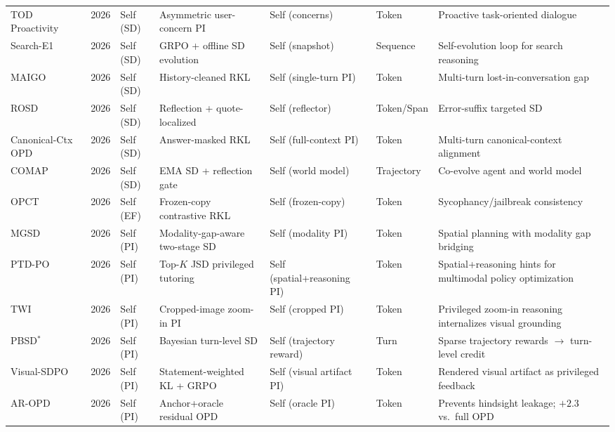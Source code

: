 \documentclass{article} %
\begin{document}
\begin{table}[t]
{\begin{tabular}{@{}lclllll@{}}
        TOD Proactivity~\citep{2605.22240} & 2026 & Self (SD) & Asymmetric user-concern PI & Self (concerns) & Token & Proactive task-oriented dialogue \\
        Search-E1~\citep{2605.22511} & 2026 & Self (SD) & GRPO + offline SD evolution & Self (snapshot) & Sequence & Self-evolution loop for search reasoning \\
        MAIGO~\citep{2605.27186} & 2026 & Self (SD) & History-cleaned RKL & Self (single-turn PI) & Token & Multi-turn lost-in-conversation gap \\
        ROSD~\citep{2605.28014} & 2026 & Self (SD) & Reflection + quote-localized & Self (reflector) & Token/Span & Error-suffix targeted SD \\
        Canonical-Ctx OPD~\citep{2605.30251} & 2026 & Self (SD) & Answer-masked RKL & Self (full-context PI) & Token & Multi-turn canonical-context alignment \\
        COMAP~\citep{2606.02372} & 2026 & Self (SD) & EMA SD + reflection gate & Self (world model) & Trajectory & Co-evolve agent and world model \\
        OPCT~\citep{2605.21834} & 2026 & Self (EF) & Frozen-copy contrastive RKL & Self (frozen-copy) & Token & Sycophancy/jailbreak consistency \\
        MGSD~\citep{2606.06076} & 2026 & Self (PI) & Modality-gap-aware two-stage SD & Self (modality PI) & Token & Spatial planning with modality gap bridging \\
        PTD-PO~\citep{2606.07000} & 2026 & Self (PI) & Top-$K$ JSD privileged tutoring & Self (spatial+reasoning PI) & Token & Spatial+reasoning hints for multimodal policy optimization \\
        TWI~\citep{2606.08719} & 2026 & Self (PI) & Cropped-image zoom-in PI & Self (cropped PI) & Token & Privileged zoom-in reasoning internalizes visual grounding \\
        PBSD$^*$ \citep{2606.09348} & 2026 & Self (PI) & Bayesian turn-level SD & Self (trajectory reward) & Turn & Sparse trajectory rewards $\to$ turn-level credit \\
        Visual-SDPO~\citep{2606.10334} & 2026 & Self (PI) & Statement-weighted KL + GRPO & Self (visual artifact PI) & Token & Rendered visual artifact as privileged feedback \\
        AR-OPD~\citep{2606.10385} & 2026 & Self (PI) & Anchor+oracle residual OPD & Self (oracle PI) & Token & Prevents hindsight leakage; $+2.3$ vs.\ full OPD \\

\end{tabular}}
\end{table}
\end{document}
